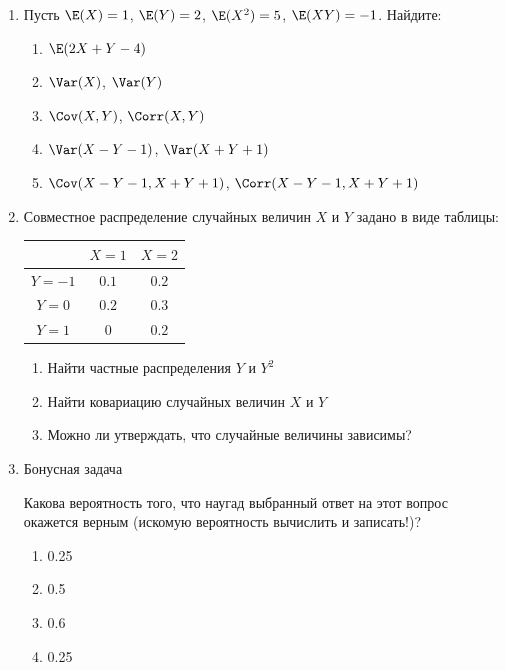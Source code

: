 \begin{enumerate}
\item Пусть $\E(X) = 1$, $\E(Y) = 2$, $\E(X^2) = 5$, $\E(XY) = -1$. Найдите:
\begin{enumerate}
\item $\E(2X + Y - 4)$
\item $\Var(X)$, $\Var(Y)$
\item $\Cov(X,Y)$, $\Corr(X,Y)$
\item $\Var(X-Y-1)$,  $\Var(X+Y+1)$
\item $\Cov(X-Y-1, X+Y+1)$,  $\Corr(X-Y-1, X+Y+1)$
\end{enumerate}

\item Совместное распределение случайных величин $X$ и $Y$ задано в виде таблицы:

\begin{tabular}{ccc}
\toprule
 & $X=1$ & $X=2$ \\ \midrule
$Y=-1$ & $0.1$ & $0.2$ \\
$Y=0$ & $0.2$ & $0.3$ \\
$Y=1$ & $0$ & $0.2$ \\ \bottomrule
\end{tabular}

\begin{enumerate}
\item Найти частные распределения $Y$ и $Y^2$
\item Найти ковариацию случайных величин $X$ и $Y$
\item Можно ли утверждать, что случайные величины зависимы?
\end{enumerate}

\item Бонусная задача

Какова вероятность того, что наугад выбранный ответ на этот вопрос окажется верным
(искомую вероятность вычислить и записать!)?
\begin{enumerate}
\item 0.25
\item 0.5
\item 0.6
\item 0.25
\end{enumerate}
\end{enumerate}

